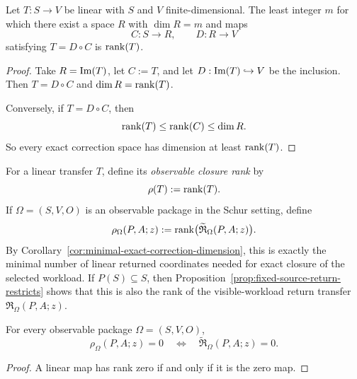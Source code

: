 \begin{corollary}
\label{cor:minimal-exact-correction-dimension}
Let \(T:S\to V\) be linear with \(S\) and \(V\) finite-dimensional. The least
integer \(m\) for which there exist a space \(R\) with \(\dim R=m\) and maps
\[
C:S\to R,
\qquad
D:R\to V
\]
satisfying \(T=D\circ C\) is \(\mathrm{rank}(T)\).
\end{corollary}

\begin{proof}
Take \(R=\mathrm{Im}(T)\), let \(C:=T\), and let \(D:\mathrm{Im}(T)\hookrightarrow V\) be the
inclusion. Then \(T=D\circ C\) and \(\dim R=\mathrm{rank}(T)\).

Conversely, if \(T=D\circ C\), then
\[
\mathrm{rank}(T)\le \mathrm{rank}(C)\le \dim R.
\]
So every exact correction space has dimension at least \(\mathrm{rank}(T)\).
\end{proof}

\begin{definition}
\label{def:observable-closure-rank}
For a linear transfer \(T\), define its \emph{observable closure rank} by
\[
\rho(T):=\mathrm{rank}(T).
\]
If \(\Omega=(S,V,O)\) is an observable package in the Schur setting, define
\[
\rho_{\Omega}(P,A;z):=
\mathrm{rank}\bigl(\widetilde{\mathfrak R}_{\Omega}(P,A;z)\bigr).
\]
By Corollary~\ref{cor:minimal-exact-correction-dimension}, this is exactly the
minimal number of linear returned coordinates needed for exact closure of the
selected workload. If \(P(S)\subseteq S\), then
Proposition~\ref{prop:fixed-source-return-restricts} shows that this is also
the rank of the visible-workload return transfer
\(\mathfrak R_{\Omega}(P,A;z)\).
\end{definition}

\begin{corollary}
\label{cor:zero-closure-rank}
For every observable package \(\Omega=(S,V,O)\),
\[
\rho_{\Omega}(P,A;z)=0
\quad\Longleftrightarrow\quad
\widetilde{\mathfrak R}_{\Omega}(P,A;z)=0.
\]
\end{corollary}

\begin{proof}
A linear map has rank zero if and only if it is the zero map.
\end{proof}

